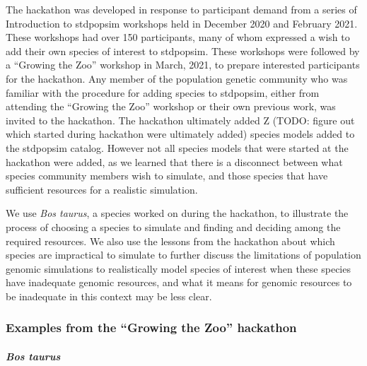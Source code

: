 \documentclass[hidelinks]{article}
\begin{document}
The hackathon was developed in response to participant demand from a
series of Introduction to stdpopsim workshops held in December 2020 and
February 2021. These workshops had over 150 participants, many of whom
expressed a wish to add their own species of interest to stdpopsim.
These workshops were followed by a ``Growing the Zoo'' workshop in
March, 2021, to prepare interested participants for the hackathon. Any
member of the population genetic community who was familiar with the
procedure for adding species to stdpopsim, either from attending the
``Growing the Zoo'' workshop or their own previous work, was invited to
the hackathon. The hackathon ultimately added Z (TODO: figure out which
started during hackathon were ultimately added) species models added to
the stdpopsim catalog. However not all species models that were started
at the hackathon were added, as we learned that there is a disconnect
between what species community members wish to simulate, and those
species that have sufficient resources for a realistic simulation.

We use \emph{Bos taurus}, a species worked on during the hackathon, to
illustrate the process of choosing a species to simulate and finding and
deciding among the required resources. We also use the lessons from the
hackathon about which species are impractical to simulate to further
discuss the limitations of population genomic simulations to
realistically model species of interest when these species have
inadequate genomic resources, and what it means for genomic resources to
be inadequate in this context may be less clear.

\hypertarget{examples-from-the-growing-the-zoo-hackathon}{%
\subsubsection*{Examples from the ``Growing the Zoo''
hackathon}\label{examples-from-the-growing-the-zoo-hackathon}}

\hypertarget{bos-taurus}{%
\paragraph{\texorpdfstring{\emph{Bos
taurus}}{Bos taurus}}\label{bos-taurus}}
\end{document}
